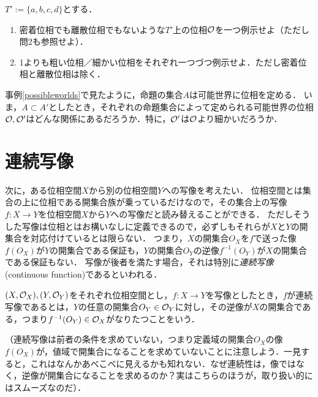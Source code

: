 \documentclass[11pt,a4paper]{jsarticle}
\begin{document}
\begin{exercise}
$T':=\{a, b, c, d\}$とする．
\begin{enumerate}
 \item 密着位相でも離散位相でもないような$T'$上の位相$\mathcal{O}$を一つ例示せよ（ただし問2も参照せよ）．
 \item 1よりも粗い位相／細かい位相をそれぞれ一つづつ例示せよ．ただし密着位相と離散位相は除く．
\end{enumerate}
\end{exercise}


\begin{develop}
事例\ref{possibleworlds}で見たように，命題の集合$A$は可能世界に位相を定める．
いま，$A \subset A'$としたとき，それぞれの命題集合によって定められる可能世界の位相$\mathcal{O}, \mathcal{O}'$はどんな関係にあるだろうか．特に，$\mathcal{O}'$は$\mathcal{O}$より細かいだろうか．
\end{develop}






\section{連続写像}
次に，ある位相空間$X$から別の位相空間$Y$への写像を考えたい．
位相空間とは集合の上に位相である開集合族が乗っているだけなので，その集合上の写像$f:X \to Y$を位相空間$X$から$Y$への写像だと読み替えることができる．
ただしそうした写像は位相とはお構いなしに定義できるので，必ずしもそれらが$X$と$Y$の開集合を対応付けているとは限らない．
つまり，$X$の開集合$O_X$を$f$で送った像$f(O_X)$が$Y$の開集合である保証も，$Y$の開集合$O_Y$の逆像$f^{-1}(O_Y)$が$X$の開集合である保証もない．
写像が後者を満たす場合，それは特別に\emph{連続写像}(continuous function)であるといわれる．

\begin{dfn}[連続写像]
$(X, \mathcal{O}_X), (Y, \mathcal{O}_Y)$をそれぞれ位相空間とし，$f:X \to Y$を写像としたとき，$f$が連続写像であるとは，$Y$の任意の開集合$O_Y \in \mathcal{O}_Y$に対し，その逆像が$X$の開集合である，つまり$f^{-1}(O_Y) \in \mathcal{O}_X$がなりたつことをいう．
\end{dfn}

（連続写像は前者の条件を求めていない，つまり定義域の開集合$O_X$の像$f(O_X)$が，値域で開集合になることを求めていないことに注意しよう．一見すると，これはなんかあべこべに見えるかも知れない．なぜ連続性は，像ではなく，逆像が開集合になることを求めるのか？実はこちらのほうが，取り扱い的にはスムーズなのだ）．
\end{document}
